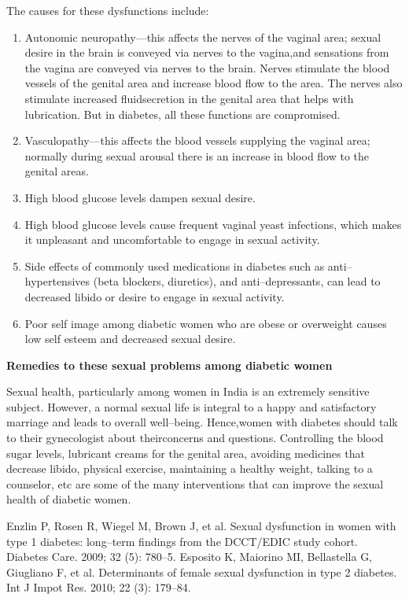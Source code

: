 \noindent The causes for these dysfunctions include:
\begin{enumerate}[•]
\itemsep=0pt
\item Autonomic neuropathy—this affects the nerves of the vaginal area; sexual desire in the brain is conveyed via nerves to the vagina,\break and sensations from the vagina are conveyed via nerves to the brain. Nerves stimulate the blood vessels of the genital area and increase blood flow to the area. The nerves also stimulate increased fluid\break secretion in the genital area that helps with lubrication. But in dia\-betes, all these functions are compromised.
\item Vasculopathy—this affects the blood vessels supplying the vaginal area; normally during sexual arousal there is an increase in blood flow to the genital areas.
\item High blood glucose levels dampen sexual desire.
\item High blood glucose levels cause frequent vaginal yeast infections, which makes it unpleasant and uncomfortable to engage in sexual activity.
\item Side effects of commonly used medications in diabetes such as anti–hypertensives (beta blockers, diuretics), and anti–depressants, can lead to decreased libido or desire to engage in sexual activity.
\item Poor self image among diabetic women who are obese or overweight causes low self esteem and decreased sexual desire.
\end{enumerate}

\noindent\textbf{Remedies to these sexual problems among diabetic women}

Sexual health, particularly among women in India is an extremely sensitive subject. However, a normal sexual life is integral to a happy and satisfactory marriage and leads to overall well–being. Hence,\break women with diabetes should talk to their gynecologist about their\break concerns and questions. Controlling the blood sugar levels, lubricant creams for the genital area, avoiding medicines that decrease libido, physical exercise, maintaining a healthy weight, talking to a counselor, etc are some of the many interventions that can improve the sexual health of diabetic women.

\begin{thebibliography}{99}
 Enzlin P, Rosen R, Wiegel M, Brown J, et al. Sexual dysfunction in women with type 1 diabetes: long–term findings from the DCCT/EDIC study cohort. Diabetes Care. 2009; 32 (5): 780–5.
 Esposito K, Maiorino MI, Bellastella G, Giugliano F, et al. Determinants of female sexual dysfunction in type 2 diabetes. Int J Impot Res. 2010; 22 (3): 179–84.
\end{thebibliography}


